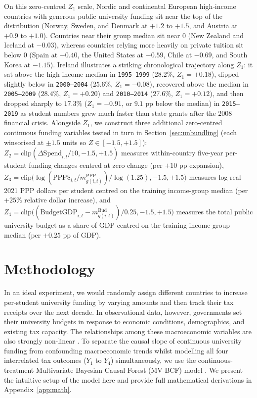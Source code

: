 \documentclass[11pt,a4paper]{article}
\begin{document}
On this zero-centred $Z_1$ scale, Nordic and continental European high-income countries with generous public university funding sit near the top of the distribution (Norway, Sweden, and Denmark at $+1.2$ to $+1.5$, and Austria at $+0.9$ to $+1.0$). Countries near their group median sit near $0$ (New Zealand and Iceland at $-0.03$), whereas countries relying more heavily on private tuition sit below $0$ (Spain at $-0.40$, the United States at $-0.59$, Chile at $-0.69$, and South Korea at $-1.15$). Ireland illustrates a striking chronological trajectory along $Z_1$: it sat above the high-income median in \texttt{1995--1999} ($28.2\%$, $Z_1 = +0.18$), dipped slightly below in \texttt{2000--2004} ($25.6\%$, $Z_1 = -0.08$), recovered above the median in \texttt{2005--2009} ($28.4\%$, $Z_1 = +0.20$) and \texttt{2010--2014} ($27.6\%$, $Z_1 = +0.12$), and then dropped sharply to $17.3\%$ ($Z_1 = -0.91$, or $9.1$ pp below the median) in \texttt{2015--2019} as student numbers grew much faster than state grants after the 2008 financial crisis. Alongside $Z_1$, we construct three additional zero-centred continuous funding variables tested in turn in Section~\ref{sec:unbundling} (each winsorised at $\pm 1.5$ units so $Z \in [-1.5, +1.5]$): $Z_2 = \text{clip}(\Delta \text{Spend}_{i,t} / 10, -1.5, +1.5)$ measures within-country five-year per-student funding changes centred at zero change (per $+10$ pp expansion), $Z_3 = \text{clip}\bigl(\log(\text{PPP\$}_{i,t} / m^{\text{PPP}}_{g(i,t)}) / \log(1.25), -1.5, +1.5\bigr)$ measures log real 2021 PPP dollars per student centred on the training income-group median (per $+25\%$ relative dollar increase), and $Z_4 = \text{clip}\bigl((\text{BudgetGDP}_{i,t} - m^{\text{Bud}}_{g(i,t)}) / 0.25, -1.5, +1.5\bigr)$ measures the total public university budget as a share of GDP centred on the training income-group median (per $+0.25$ pp of GDP).

\section{Methodology}
\label{sec:methods}

In an ideal experiment, we would randomly assign different countries to increase per-student university funding by varying amounts and then track their tax receipts over the next decade. In observational data, however, governments set their university budgets in response to economic conditions, demographics, and existing tax capacity. The relationships among these macroeconomic variables are also strongly non-linear \citep{hill2011bayesian, hill2020bayesian}. To separate the causal slope of continuous university funding from confounding macroeconomic trends whilst modelling all four interrelated tax outcomes ($Y_1$ to $Y_4$) simultaneously, we use the continuous-treatment Multivariate Bayesian Causal Forest (MV-BCF) model \citep{hahn2020bayesian, mcjames2024mvbcf}. We present the intuitive setup of the model here and provide full mathematical derivations in Appendix~\ref{app:math}.
\end{document}
